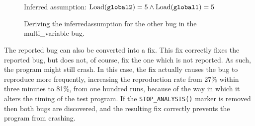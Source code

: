 \begin{figure}
  \hfill
  \\
  \\
  Inferred assumption: $\mathrm{Load}(\texttt{global2}) = 5 \wedge \mathrm{Load}(\texttt{global1}) = 5$
  \caption{Deriving the \gls{inferredassumption} for the other bug in
    the multi\_variable bug.}
  \label{fig:eval:multi_variable:other_bug}
\end{figure}

The reported bug can also be converted into a fix.  This fix correctly
fixes the reported bug, but does not, of course, fix the one which is
not reported.  As such, the program might still crash.  In this case,
the fix actually causes the bug to reproduce more frequently,
increasing the reproduction rate from 27\% within three minutes to
81\%, from one hundred runs, because of the way in which it alters the
timing of the test program.  If the \texttt{STOP\_ANALYSIS()} marker
is removed then both bugs are discovered, and the resulting fix
correctly prevents the program from crashing.

